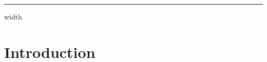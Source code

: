\documentclass[titlepage]{\econtex}
\begin{document}



\noindent \hrule height 0.4pt depth 0.0pt width \textwidth \relax
\hypertarget{Introduction}{}
\section{Introduction}\label{sec:Intro}
\end{document}
